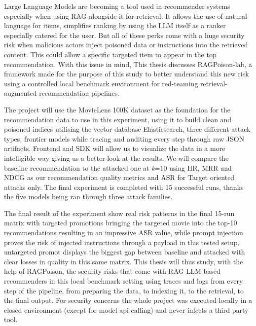 Large Language Models are becoming a tool used in recommender systems especially when using RAG alongside it for retrieval. It allows the use of natural language for items, simplifies ranking by using the LLM itself as a ranker especially catered for the user. But all of these perks come with a huge security risk when malicious actors inject poisoned data or instructions into the retrieved content. This could allow a specific targeted item to appear in the top recommendation. With this issue in mind, This thesis discusses RAGPoison-lab, a framework made for the purpose of this study to better understand this new risk using a controlled local benchmark environment for red-teaming retrieval-augmented recommendation pipelines.

The project will use the MovieLens 100K dataset as the foundation for the recommendation data to use in this experiment, using it to build clean and poisoned indices utilising the vector database Elasticsearch, three different attack types, frontier models while tracing and auditing every step through raw JSON artifacts. Frontend and SDK will allow us to visualize the data in a more intelligible way giving us a better look at the results. We will compare the baseline recommendation to the attacked one at \textit{k}=10 using HR, MRR and NDCG as our recommendation quality metrics and ASR for Target oriented attacks only. The final experiment is completed with 15 successful runs, thanks the five models being ran through three attack families.

The final result of the experiment show real risk patterns in the final 15-run matrix with targeted promotions bringing the targeted movie into the top-10 recommendations resulting in an impressive ASR value, while prompt injection proves the risk of injected instructions through a payload in this tested setup. untargeted promot displays the biggest gap between baseline and attacked with clear losses in quality in this same matrix. This thesis will thus study, with the help of RAGPoison, the security risks that come with RAG LLM-based recommenders in this local benchmark setting using traces and logs from every step of the pipeline, from preparing the data, to indexing it, to the retrieval, to the final output. For security concerns the whole project was executed locally in a closed environment (except for model api calling) and never infects a third party tool.
